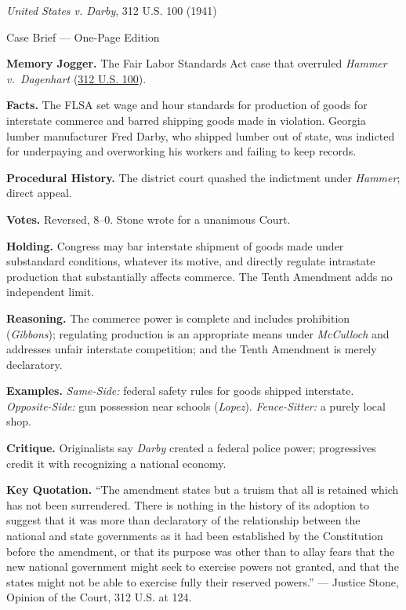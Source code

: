 \documentclass[12pt]{article}
\begin{document}
\begin{center}
{\Large \textit{United States v. Darby}, 312 U.S. 100 (1941)\par}
\vspace{0.3em}
{\normalsize Case Brief --- One-Page Edition\par}
\end{center}

\textbf{Memory Jogger.} The Fair Labor Standards Act case that overruled \textit{Hammer v.\ Dagenhart} (\href{https://supreme.justia.com/cases/federal/us/312/100/}{312 U.S. 100}).

\textbf{Facts.} The FLSA set wage and hour standards for production of goods for interstate commerce and barred shipping goods made in violation. Georgia lumber manufacturer Fred Darby, who shipped lumber out of state, was indicted for underpaying and overworking his workers and failing to keep records.

\textbf{Procedural History.} The district court quashed the indictment under \textit{Hammer}; direct appeal.

\textbf{Votes.} Reversed, 8--0. Stone wrote for a unanimous Court.

\textbf{Holding.} Congress may bar interstate shipment of goods made under substandard conditions, whatever its motive, and directly regulate intrastate production that substantially affects commerce. The Tenth Amendment adds no independent limit.

\textbf{Reasoning.} The commerce power is complete and includes prohibition (\textit{Gibbons}); regulating production is an appropriate means under \textit{McCulloch} and addresses unfair interstate competition; and the Tenth Amendment is merely declaratory.

\textbf{Examples.} \emph{Same-Side:} federal safety rules for goods shipped interstate. \emph{Opposite-Side:} gun possession near schools (\textit{Lopez}). \emph{Fence-Sitter:} a purely local shop.

\textbf{Critique.} Originalists say \textit{Darby} created a federal police power; progressives credit it with recognizing a national economy.

\textbf{Key Quotation.} ``The amendment states but a truism that all is retained which has not been surrendered. There is nothing in the history of its adoption to suggest that it was more than declaratory of the relationship between the national and state governments as it had been established by the Constitution before the amendment, or that its purpose was other than to allay fears that the new national government might seek to exercise powers not granted, and that the states might not be able to exercise fully their reserved powers.'' --- Justice Stone, Opinion of the Court, 312 U.S. at 124.
\end{document}
